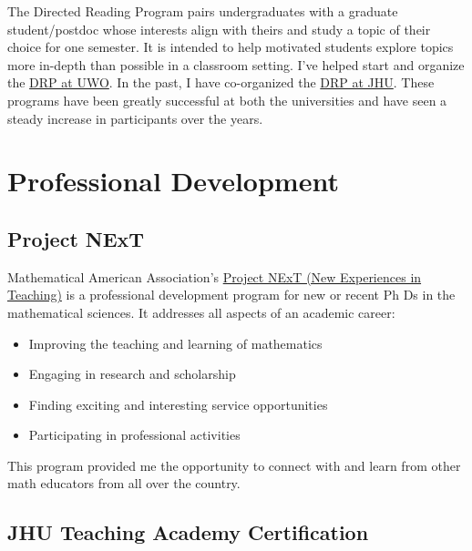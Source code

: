 \documentclass[
]{report}
\providecommand{\tightlist}{%
  \setlength{\itemsep}{0pt}\setlength{\parskip}{0pt}}
\begin{document}
The Directed Reading Program pairs undergraduates with a graduate student/postdoc whose interests align with theirs and study a topic of their choice for one semester. It is intended to help motivated students explore topics more in-depth than possible in a classroom setting. I've helped start and organize the \href{https://www.math.uwo.ca/undergraduate/current_students/directed_reading_program.html}{DRP at UWO}. In the past, I have co-organized the \href{https://math.jhu.edu/drp.html}{DRP at JHU}.
These programs have been greatly successful at both the universities and have seen a steady increase in participants over the years.

\hypertarget{professional-development-1}{%
\chapter{Professional Development}\label{professional-development-1}}

\hypertarget{project-next}{%
\section{Project NExT}\label{project-next}}

Mathematical American Association's \href{https://www.maa.org/programs-and-communities/professional-development/project-next}{Project NExT (New Experiences in Teaching)} is a professional development program for new or recent Ph Ds in the mathematical sciences. It addresses all aspects of an academic career:

\begin{itemize}
\tightlist
\item
  Improving the teaching and learning of mathematics
\item
  Engaging in research and scholarship
\item
  Finding exciting and interesting service opportunities
\item
  Participating in professional activities
\end{itemize}

This program provided me the opportunity to connect with and learn from other math educators from all over the country.

\hypertarget{jhu-teaching-academy-certification}{%
\section{JHU Teaching Academy Certification}\label{jhu-teaching-academy-certification}}
\end{document}
